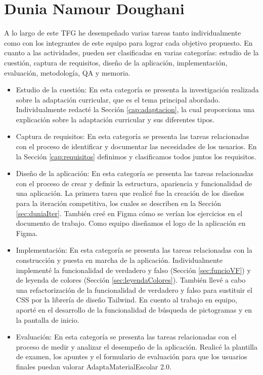 \section{Dunia Namour Doughani}
A lo largo de este TFG he desempeñado varias tareas tanto individualmente como con los integrantes de este equipo para lograr cada objetivo propuesto. En cuanto a las actividades, pueden ser clasificadas en varias categorías: estudio de la cuestión, captura de requisitos, diseño de la aplicación, implementación, evaluación, metodología, QA y memoria.
\begin{itemize}
    \item Estudio de la cuestión: En esta categoría se presenta la investigación realizada sobre la adaptación curricular, que es el tema principal abordado. Individualmente redacté la Sección \ref{cap:adaptacion}, la cual proporciona una explicación sobre la adaptación curricular y sus diferentes tipos.
    \item Captura de requisitos: En esta categoría se presenta las tareas relacionadas con el proceso de identificar y documentar las necesidades de los usuarios. En la Sección \ref{cap:requisitos} definimos y clasificamos todos juntos los requisitos.
    \item Diseño de la aplicación: En esta categoría se presenta las tareas relacionadas con el proceso de crear y definir la estructura, apariencia y funcionalidad de una aplicación. La primera tarea que realicé fue la creación de los diseños para la iteración competitiva, los cuales se describen en la Sección \ref{sec:duniaIter}. También creé en Figma cómo se verían los ejercicios en el documento de trabajo. Como equipo diseñamos el logo de la aplicación en Figma.
    \item Implementación: En esta categoría se presenta las tareas relacionadas con la construcción y puesta en marcha de la aplicación. Individualmente implementé la funcionalidad de verdadero y falso (Sección \ref{sec:funcioVF}) y de leyenda de colores (Sección \ref{sec:leyendaColores}). También llevé a cabo una refactorización de la funcionalidad de verdadero y falso para sustituir el CSS por la librería de diseño Tailwind. En cuento al trabajo en equipo, aporté en el desarrollo de la funcionalidad de búsqueda de pictogramas y en la pantalla de inicio.
    \item Evaluación: En esta categoría se presenta las tareas relacionadas con el proceso de medir y analizar el desempeño de la aplicación. Realicé la plantilla de examen, los apuntes y el formulario de evaluación para que los usuarios finales puedan valorar AdaptaMaterialEscolar 2.0.

\end{itemize}
